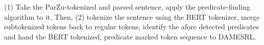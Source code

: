 (1) Take the ParZu-tokenized and parsed sentence, apply the predicate-finding algorithm to it.
Then, (2) tokenize the sentence using the BERT tokenizer, merge subtokenized tokens back to
regular tokens, identify the afore detected predicates and hand the BERT tokenized, predicate marked token sequence to DAMESRL.






